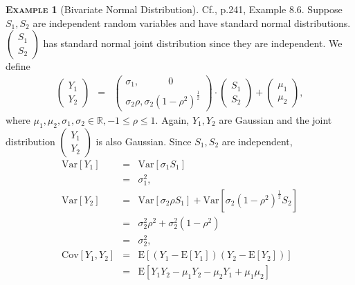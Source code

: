\documentclass[a4paper, twoside, 11pt]{article}
\theoremstyle{definition}
\newtheorem{example}[definition]{\scshape Example}
\begin{document}
  \begin{example}[Bivariate Normal Distribution]
	Cf.\cite{severini}, p.241, Example 8.6. Suppose $S_1, S_2$ are independent random variables and have standard normal distributions. $\left(
	  \begin{array}{c}
		S_1 \\
		S_2
	  \end{array}
	\right)$  has standard normal joint distribution since they are independent. We define
	\begin{eqnarray}
	  \left(
	  \begin{array}{c}
		Y_1 \\
		Y_2
	  \end{array}
	  \right)
	  &=& 
	  \left(
	  \begin{array}{l}
		\sigma_1,\hspace{3em} 0 \\
		\sigma_2 \rho, \sigma_2(1-\rho^2)^{\frac{1}{2}}
	  \end{array}
	\right) \cdot
	  \left(
	  \begin{array}{c}
		S_1 \\
		S_2
	  \end{array}
	\right)  +
	\left(
	  \begin{array}{c}
		\mu_1 \\
		\mu_2
	  \end{array}
	\right)
	\label{sec:bi},
	\end{eqnarray}
	where $\mu_1, \mu_2, \sigma_1, \sigma_2 \in \mathbb{R}, -1 \le \rho \le 1$. Again, $Y_1, Y_2$ are Gaussian and the joint distribution  $\left(
	  \begin{array}{c}
		Y_1 \\
		Y_2
	  \end{array}
	  \right)$ is also Gaussian.  Since $S_1, S_2$ are independent,
	  \begin{eqnarray*}
		\mathrm{Var}[Y_1] &=& \mathrm{Var}[\sigma_1 S_1]\\
						   &=& \sigma_1^2 ,\\
						   \mathrm{Var}[Y_2] &=& \mathrm{Var}[\sigma_2\rho S_1] + \mathrm{Var}[\sigma_2 (1-\rho^2)^{\frac{1}{2}} S_2]\\
						   &=& \sigma_2^2 \rho^2 + \sigma_2^2(1 - \rho^2)\\
						   &=& \sigma_2^2,\\
						   \mathrm{Cov}[Y_1, Y_2] &=& \mathrm{E}[(Y_1 - \mathrm{E}[Y_1])(Y_2 - \mathrm{E}[Y_2])]\\
						   &=& \mathrm{E}[Y_1Y_2 - \mu_1Y_2 - \mu_2Y_1 + \mu_1\mu_2]\\

\end{eqnarray*}
\end{example}
\end{document}
